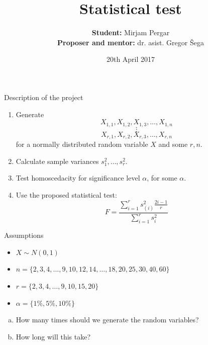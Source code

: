 \documentclass{beamer}
\title[Statistical test]
{Statistical test}
\author[Mirjam Pergar]
{\textbf{Student:}  Mirjam Pergar\\
\textbf{Proposer and mentor:} dr. asist. Gregor Šega
}
\institute[Fakuleta za matematiko in fiziko]
\date[20th April 2017] %
{20th April 2017}
\begin{document}
\begin{frame}
\titlepage
\end{frame}

\begin{frame}{Description of the project}
\begin{enumerate}
\item Generate 
$$X_{1,1}, X_{1,2},X_{1,3}, \dots , X_{1,n}$$
$$\vdots$$
$$X_{r,1}, X_{r,2}, X_{r,3}, \dots, X_{r,n}$$
for a normally distributed random variable $X$ and some $r, n$.
\item Calculate sample variances $s^2_{1}, \dots, s^2_{r}$.
\item Test homoscedacity for significance level $\alpha$, for some $\alpha$.
\item Use the proposed statistical test: $$F =\frac{ \sum_{i=1}^{r} s^2_{(i)} \frac{2i-1}{r}}{\sum_{i=1}^{r} s^2_{i}}$$
\end{enumerate}
\end{frame}

\begin{frame}{Assumptions}
\begin{itemize}
\item $X \sim N(0,1)$
\item $n = \{2,3,4,\dots, 9,10,12,14,\dots, 18,20,25,30,40,60\}$
\item $r = \{2,3,4, \dots ,9,10,15,20\}$
\item $\alpha = \{1\%,5\%,10\%\}$
\end{itemize}
\pause
\begin{enumerate}[(a)]
\item How many times should we generate the random variables?
\item How long will this take?
\end{enumerate}

\end{frame}
\end{document}
